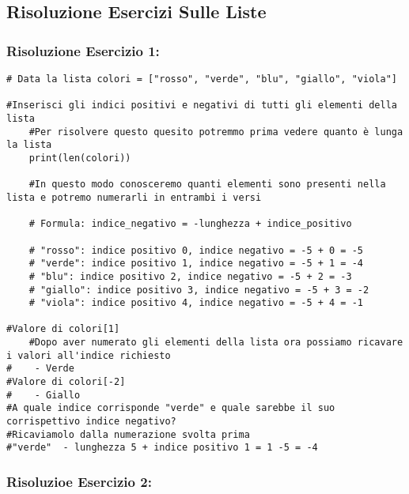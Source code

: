 \subsection{Risoluzione Esercizi Sulle Liste}

\subsubsection{Risoluzione Esercizio 1: }

\begin{lstlisting}
# Data la lista colori = ["rosso", "verde", "blu", "giallo", "viola"]

#Inserisci gli indici positivi e negativi di tutti gli elementi della lista
    #Per risolvere questo quesito potremmo prima vedere quanto è lunga la lista
    print(len(colori))
    
    #In questo modo conosceremo quanti elementi sono presenti nella lista e potremo numerarli in entrambi i versi

    # Formula: indice_negativo = -lunghezza + indice_positivo
    
    # "rosso": indice positivo 0, indice negativo = -5 + 0 = -5
    # "verde": indice positivo 1, indice negativo = -5 + 1 = -4
    # "blu": indice positivo 2, indice negativo = -5 + 2 = -3
    # "giallo": indice positivo 3, indice negativo = -5 + 3 = -2
    # "viola": indice positivo 4, indice negativo = -5 + 4 = -1
        
#Valore di colori[1]
    #Dopo aver numerato gli elementi della lista ora possiamo ricavare i valori all'indice richiesto
#    - Verde
#Valore di colori[-2]
#    - Giallo
#A quale indice corrisponde "verde" e quale sarebbe il suo corrispettivo indice negativo?
#Ricaviamolo dalla numerazione svolta prima
#"verde"  - lunghezza 5 + indice positivo 1 = 1 -5 = -4
\end{lstlisting}


\subsubsection{Risoluzioe Esercizio 2: }

